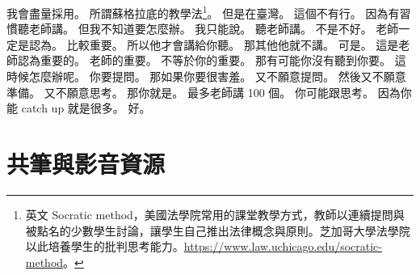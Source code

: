 \hypertarget{c01:cue:971}{}我會盡量採用。
\hypertarget{c01:cue:972}{}所謂蘇格拉底的教學法\footnote{英文 Socratic method，美國法學院常用的課堂教學方式，教師以連續提問與被點名的少數學生討論，讓學生自己推出法律概念與原則。芝加哥大學法學院以此培養學生的批判思考能力。\url{https://www.law.uchicago.edu/socratic-method}。}。
\hypertarget{c01:cue:973}{}但是在臺灣。
\hypertarget{c01:cue:974}{}這個不有行。
\hypertarget{c01:cue:975}{}因為有習慣聽老師講。
\hypertarget{c01:cue:976}{}但我不知道要怎麼辦。
\hypertarget{c01:cue:977}{}我只能說。
\hypertarget{c01:cue:978}{}聽老師講。
\hypertarget{c01:cue:979}{}不是不好。
\hypertarget{c01:cue:980}{}老師一定是認為。
\hypertarget{c01:cue:981}{}比較重要。
\hypertarget{c01:cue:982}{}所以他才會講給你聽。
\hypertarget{c01:cue:983}{}那其他他就不講。
\hypertarget{c01:cue:984}{}可是。
\hypertarget{c01:cue:985}{}這是老師認為重要的。
\hypertarget{c01:cue:986}{}老師的重要。
\hypertarget{c01:cue:987}{}不等於你的重要。
\hypertarget{c01:cue:988}{}那有可能你沒有聽到你要。
\hypertarget{c01:cue:989}{}這時候怎麼辦呢。
\hypertarget{c01:cue:990}{}你要提問。
\hypertarget{c01:cue:991}{}那如果你要很害羞。
\hypertarget{c01:cue:992}{}又不願意提問。
\hypertarget{c01:cue:993}{}然後又不願意準備。
\hypertarget{c01:cue:994}{}又不願意思考。
\hypertarget{c01:cue:995}{}那你就是。
\hypertarget{c01:cue:996}{}最多老師講 100 個。
\hypertarget{c01:cue:997}{}你可能跟思考。
\hypertarget{c01:cue:998}{}因為你能 catch up 就是很多。
\hypertarget{c01:cue:999}{}好。

\section{共筆與影音資源}

